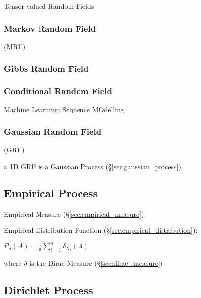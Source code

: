 Tensor-valued Random Fields



\subsubsection{Markov Random Field}\label{sec:markov_random_field}

(MRF)



\subsubsection{Gibbs Random Field}\label{sec:gibbs_random_field}

\subsubsection{Conditional Random Field}\label{sec:conditional_random_field}

Machine Learning: Sequence MOdelling



\subsubsection{Gaussian Random Field}\label{sec:gaussian_random_field}

(GRF)

a 1D GRF is a Gaussian Process (\S\ref{sec:gaussian_process})



\subsection{Empirical Process}\label{sec:empirical_process}

Empirical Measure (\S\ref{sec:empirical_measure}):

Empirical Distribution Function (\S\ref{sec:empirical_distribution}):

$P_n(A) = \frac{1}{n}\sum_{i=1}^n \delta_{X_i}(A)$

where $\delta$ is the Dirac Measure (\S\ref{sec:dirac_measure})



\subsection{Dirichlet Process}\label{sec:dirichlet_process}


